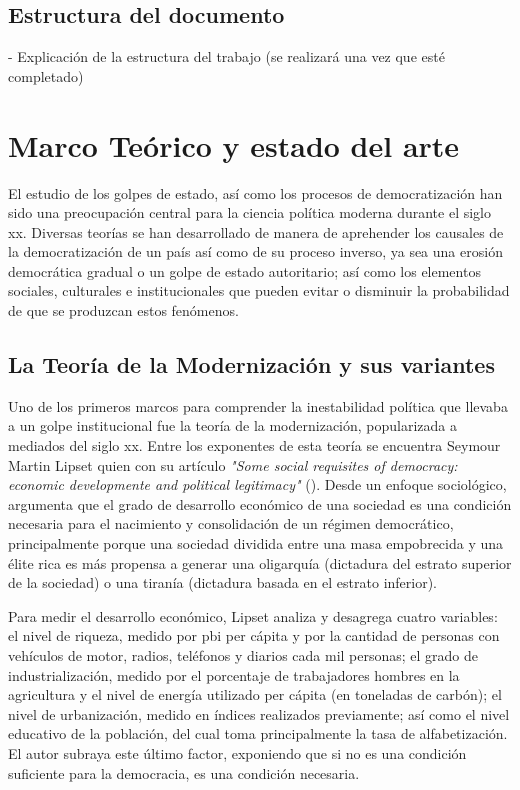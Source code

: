 \documentclass{article}
\begin{document}
\subsection{Estructura del documento}
- Explicación de la estructura del trabajo (se realizará una vez que esté completado)


\section{Marco Teórico y estado del arte}

El estudio de los golpes de estado, así como los procesos de democratización han sido una 
preocupación central para la ciencia política moderna durante el siglo xx. Diversas teorías
se han desarrollado de manera de aprehender los causales de la democratización
de un país así como de su proceso inverso, ya sea una erosión democrática gradual o un
golpe de estado autoritario; así como los elementos sociales, culturales e institucionales 
que pueden evitar o disminuir la probabilidad de que se produzcan estos fenómenos.

\subsection{La Teoría de la Modernización y sus variantes}

Uno de los primeros marcos para comprender la inestabilidad política que llevaba a un golpe
institucional fue la teoría de la modernización, popularizada a mediados del siglo xx. 
Entre los exponentes de esta teoría se
encuentra Seymour Martin Lipset quien con su artículo \textit{"Some social requisites 
of democracy: economic developmente and political legitimacy"} (\citeyear{lipset1959some}). 
Desde un enfoque sociológico, 
argumenta que el grado de desarrollo económico de una sociedad es una condición 
necesaria para el nacimiento y consolidación de un régimen democrático, principalmente
porque una sociedad dividida entre una masa empobrecida y una élite rica es más
propensa a generar una oligarquía (dictadura del estrato superior de la sociedad) o una
tiranía (dictadura basada en el estrato inferior).

Para medir el desarrollo económico, Lipset analiza y desagrega cuatro variables:
el nivel de riqueza, medido por pbi per cápita y por la cantidad de personas con vehículos 
de motor, radios, teléfonos y diarios cada mil personas; el grado de industrialización, 
medido por el porcentaje de trabajadores hombres en la agricultura y el nivel de energía 
utilizado per cápita (en toneladas de carbón); el nivel de urbanización, medido en índices 
realizados previamente; así como el nivel educativo de la población, del cual toma 
principalmente la tasa de alfabetización. El autor subraya este último factor, exponiendo
que si no es una condición suficiente para la democracia, es una condición necesaria.
\end{document}
